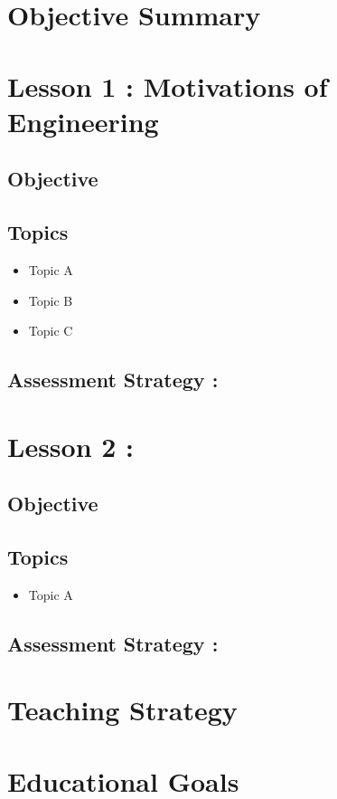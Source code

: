 \documentclass{book}
\begin{document}
	
\pagestyle{empty}


\begingroup %
\makeatletter
\def\@makeschapterhead#1{%
	{\parindent \z@ \raggedright
		\normalfont
		\interlinepenalty\@M
		\Huge \bfseries  #1\par\nobreak
		\vskip 40\p@
	}
}
\makeatother

\tableofcontents
\endgroup
\pagebreak

\section*{Objective Summary}


\section*{Lesson 1 : Motivations of Engineering}
\subsection*{Objective}

\subsection*{Topics}
\begin{itemize}
\item Topic A
\item Topic B
\item Topic C
\end{itemize}
\subsection*{Assessment Strategy : }

\section*{Lesson 2 : }
\subsection*{Objective}

\subsection*{Topics}
\begin{itemize}
\item Topic A
\end{itemize}
\subsection*{Assessment Strategy : }


\section*{Teaching Strategy}

\section*{Educational Goals}
\end{document}

